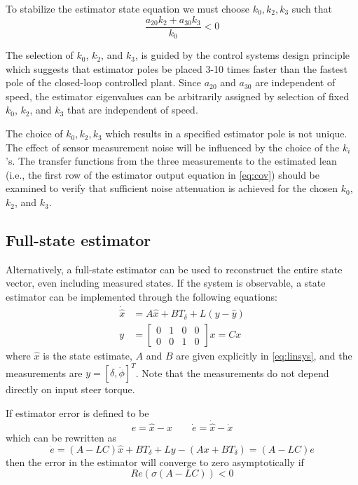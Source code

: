 \documentclass[letterpaper,11pt]{article}
\begin{document}
To stabilize the estimator state equation we must choose $k_0, k_2, k_3$ such
that
\begin{equation*}
\frac{a_{20} k_{2} + a_{30} k_{3}}{k_{0}} < 0
\end{equation*}

The selection of $k_0$, $k_2$, and $k_3$, is guided by the control systems
design principle which suggests that estimator poles be placed 3-10 times faster
than the fastest pole of the closed-loop controlled plant. Since $a_{20}$ and $a_{30}$ are
independent of speed, the estimator eigenvalues can be arbitrarily assigned by
selection of fixed $k_0$, $k_2$, and $k_3$ that are independent of speed.

The choice of $k_0, k_2, k_3$ which results in a specified estimator pole is
not unique. The effect of sensor measurement noise will be influenced by the
choice of the $k_i$'s. The transfer functions from the three measurements to
the estimated lean (i.e., the first row of the estimator output equation in
\autoref{eq:cov}) should be examined to verify that sufficient noise
attenuation is achieved for the chosen $k_0$, $k_2$, and $k_3$.

\subsection{Full-state estimator} \label{fullstate}
Alternatively, a full-state estimator can be used to reconstruct the entire
state vector, even including measured states. If the system is observable, a state
estimator can be implemented through the following equations:
\begin{align*}
\dot{\hat{x}} &= A \hat{x} + B T_\delta + L \left(y - \hat{y}\right) \\
y &= \left[\begin{smallmatrix}0 & 1 & 0 & 0\\0 & 0 & 1 & 0\end{smallmatrix}\right] x = C x
\end{align*}
where $\hat{x}$ is the state estimate, $A$ and $B$ are given explicitly in
\autoref{eq:linsys}, and the measurements are $y = \left[\delta,
\dot{\phi}\right]^T$.  Note that the measurements do not depend directly on
input steer torque.

If estimator error is defined to be
\begin{equation*}
e = \hat{x} - x
\qquad
\dot{e} = \dot{\hat{x}} - \dot{x}
\end{equation*}
which can be rewritten as
\begin{equation*}
\dot{e} = \left(A - LC\right) \hat{x} + B T_\delta + L y - \left(A x + B T_\delta\right)
= \left(A - LC\right) e
\end{equation*}
then the error in the estimator will converge to zero asymptotically if
\begin{equation*}
Re\left(\sigma\left(A - LC\right)\right) < 0
\end{equation*}
\end{document}
